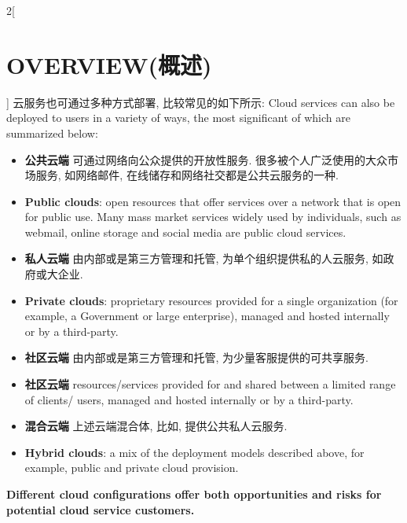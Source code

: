 \documentclass[a4paper, UTF8, 12pt]{article}
\begin{document}
\begin{paracol}{2}[\section{OVERVIEW(概述)}]
    \switchcolumn*
    云服务也可通过多种方式部署, 比较常见的如下所示:
    \switchcolumn
    Cloud services can also be deployed to users in a variety of ways, the most significant of which are summarized below: 

    \begin{itemize}
        \switchcolumn*
        \item {\bfseries 公共云端} 可通过网络向公众提供的开放性服务. 很多被个人广泛使用的大众市场服务, 如网络邮件, 在线储存和网络社交都是公共云服务的一种.
        \switchcolumn
        \item {\bfseries Public clouds}: open resources that offer services over a network that is open for public use. Many mass market services widely used by individuals, such as webmail, online storage and social media are public cloud services.
        
        \switchcolumn*
        \item {\bfseries 私人云端} 由内部或是第三方管理和托管, 为单个组织提供私的人云服务, 如政府或大企业.
        \switchcolumn 
        \item {\bfseries Private clouds}: proprietary resources provided for a single organization (for example, a Government or large enterprise), managed and hosted internally or by a third-party. 
        
        \switchcolumn*
        \item {\bfseries 社区云端} 由内部或是第三方管理和托管, 为少量客服提供的可共享服务.
        \switchcolumn 
        \item {\bfseries 社区云端} resources/services provided for and shared between a limited range of clients/ users, managed and hosted internally or by a third-party. 
        
        \switchcolumn*
        \item {\bfseries 混合云端} 上述云端混合体, 比如, 提供公共私人云服务.
        \switchcolumn 
        \item {\bfseries Hybrid clouds}: a mix of the deployment models described above, for example, public and private cloud provision. 
    \end{itemize}

    \switchcolumn
    {\bfseries Different cloud configurations offer both opportunities and risks for potential cloud service customers.}


\end{paracol}
\end{document}
